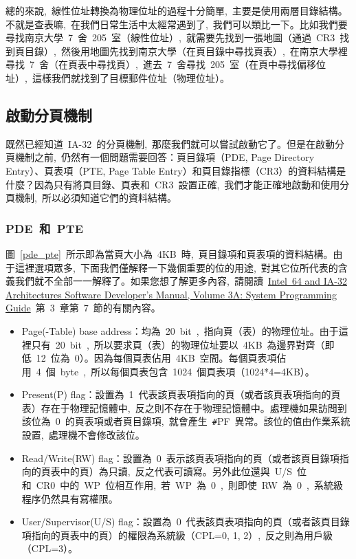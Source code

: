 總的來說,~線性位址轉換為物理位址的過程十分簡單,~主要是使用兩層目錄結構。不就是查表嘛,~在我們日常生活中太經常遇到了,~我們可以類比一下。比如我們要尋找南京大學~7~舍~205~室（線性位址）,~就需要先找到一張地圖（通過~CR3~找到頁目錄）,~然後用地圖先找到南京大學（在頁目錄中尋找頁表）,~在南京大學裡尋找~7~舍（在頁表中尋找頁）,~進去~7~舍尋找~205~室（在頁中尋找偏移位址）,~這樣我們就找到了目標郵件位址（物理位址）。


\subsection{啟動分頁機制}

既然已經知道~IA-32~的分頁機制,~那麼我們就可以嘗試啟動它了。但是在啟動分頁機制之前,~仍然有一個問題需要回答：頁目錄項（PDE, Page Directory Entry）、頁表項（PTE, Page Table Entry）和頁目錄指標（CR3）的資料結構是什麼？因為只有將頁目錄、頁表和~CR3~設置正確,~我們才能正確地啟動和使用分頁機制,~所以必須知道它們的資料結構。

\subsubsection{PDE~和~PTE}

圖~\ref{pde_pte}~所示即為當頁大小為~4KB~時,~頁目錄項和頁表項的資料結構。由于這裡選項眾多,~下面我們僅解釋一下幾個重要的位的用途,~對其它位所代表的含義我們就不全部一一解釋了。如果您想了解更多內容,~請閱讀~\href{http://download.intel.com/design/processor/manuals/253668.pdf}{Intel\textregistered~64 and IA-32 Architectures Software Developer's Manual, Volume 3A: System Programming Guide}~第~3~章第~7~節的有關內容。


\begin{itemize}
\item Page(-Table) base address：均為~20~bit~,~指向頁（表）的物理位址。由于這裡只有~20~bit~,~所以要求頁（表）的物理位址要以~4KB~為邊界對齊（即低~12~位為~0）。因為每個頁表佔用~4KB~空間。每個頁表項佔用~4~個~byte~,~所以每個頁表包含~1024~個頁表項（1024*4=4KB）。
\item Present(P) flag：設置為~1~代表該頁表項指向的頁（或者該頁表項指向的頁表）存在于物理記憶體中,~反之則不存在于物理記憶體中。處理機如果訪問到該位為~0~的頁表項或者頁目錄項,~就會產生~\texttt{\#}PF~異常。該位的值由作業系統設置,~處理機不會修改該位。
\item Read/Write(RW) flag：設置為~0~表示該頁表項指向的頁（或者該頁目錄項指向的頁表中的頁）為只讀,~反之代表可讀寫。另外此位還與~U/S~位和~CR0~中的~WP~位相互作用,~若~WP~為~0~,~則即使~RW~為~0~,~系統級程序仍然具有寫權限。
\item User/Supervisor(U/S) flag：設置為~0~代表該頁表項指向的頁（或者該頁目錄項指向的頁表中的頁）的權限為系統級（CPL=0, 1, 2）,~反之則為用戶級（CPL=3）。
\end{itemize}

